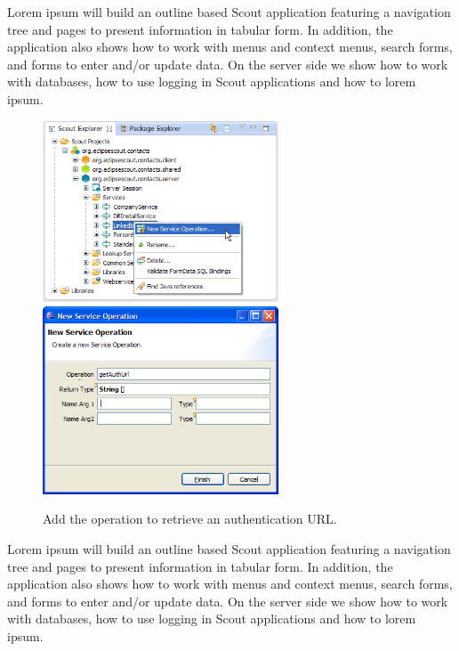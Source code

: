 \documentclass[a4paper,10pt,twoside]{book}
\begin{document}
Lorem ipsum will build an outline based Scout application featuring a navigation tree and pages to present information in tabular form. 
In addition, the application also shows how to work with menus and context menus, search forms, and forms to enter and/or update data. 
On the server side we show how to work with databases, how to use logging in Scout applications and how to lorem ipsum. 

\begin{figure}
\includegraphics[width=7cm]{new_operation_authurl_contextmenu.png} \hspace{5mm}
\includegraphics[width=7cm]{new_operation_authurl.png}
\caption{Add the operation to retrieve an authentication URL.}
\end{figure}

Lorem ipsum will build an outline based Scout application featuring a navigation tree and pages to present information in tabular form. 
In addition, the application also shows how to work with menus and context menus, search forms, and forms to enter and/or update data. 
On the server side we show how to work with databases, how to use logging in Scout applications and how to lorem ipsum. 
\end{document}
